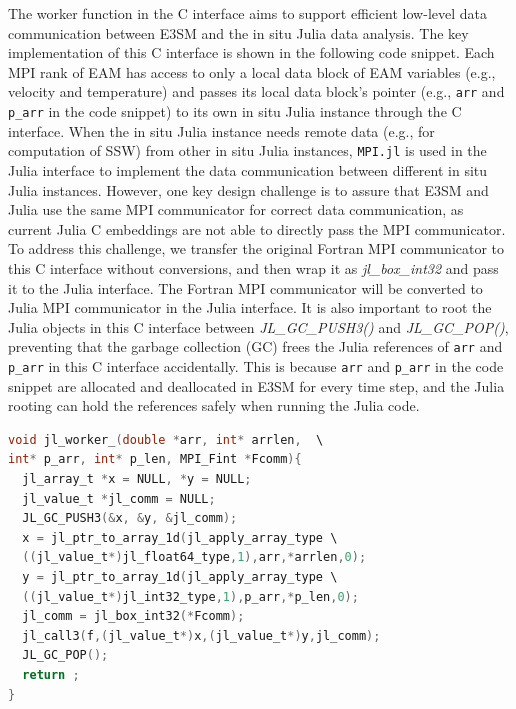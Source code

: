 \documentclass{juliacon}
\begin{document}
The worker function in the C interface aims to support efficient low-level data communication between E3SM and the in situ Julia data analysis. The key implementation of this C interface is shown in the following code snippet. Each MPI rank of EAM has access to only a local data block of EAM variables (e.g., velocity and temperature) and passes its local data block's pointer (e.g., \texttt{arr} and \texttt{p\_arr} in the code snippet) to its own in situ Julia instance through the C interface. When the in situ Julia instance needs remote data (e.g., for computation of SSW) from other in situ Julia instances, \texttt{MPI.jl} is used in the Julia interface to implement the data communication between different in situ Julia instances. However, one key design challenge is to assure that E3SM and Julia use the same MPI communicator for correct data communication, as current Julia C embeddings are not able to directly pass the MPI communicator. To address this challenge, we transfer the original Fortran MPI communicator to this C interface without conversions, and then wrap it as \textit{jl\_box\_int32} and pass it to the Julia interface. The Fortran MPI communicator will be converted to Julia MPI communicator in the Julia interface. It is also important to root the Julia objects in this C interface between \textit{JL\_GC\_PUSH3()} and \textit{JL\_GC\_POP()}, preventing that the garbage collection (GC) frees the Julia references of \texttt{arr} and \texttt{p\_arr} in this C interface accidentally. This is because \texttt{arr} and \texttt{p\_arr} in the code snippet are allocated and deallocated in E3SM for every time step, and the Julia rooting can hold the references safely when running the Julia code.

\begin{minipage}{\linewidth}
\begin{lstlisting}[language = C, caption={C interface worker.}]
void jl_worker_(double *arr, int* arrlen,  \
int* p_arr, int* p_len, MPI_Fint *Fcomm){
  jl_array_t *x = NULL, *y = NULL;
  jl_value_t *jl_comm = NULL;
  JL_GC_PUSH3(&x, &y, &jl_comm);
  x = jl_ptr_to_array_1d(jl_apply_array_type \
  ((jl_value_t*)jl_float64_type,1),arr,*arrlen,0);
  y = jl_ptr_to_array_1d(jl_apply_array_type \
  ((jl_value_t*)jl_int32_type,1),p_arr,*p_len,0);
  jl_comm = jl_box_int32(*Fcomm);
  jl_call3(f,(jl_value_t*)x,(jl_value_t*)y,jl_comm);
  JL_GC_POP();
  return ;
}

\end{lstlisting}
\end{minipage}
\end{document}
